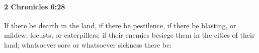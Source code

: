 
		\paragraph{2 Chronicles 6:28} %
			\label{2CHRONICLES-6-28}

			If there be dearth in the land, if there be pestilence, if there be blasting, or mildew, locusts, or caterpillers; if their enemies besiege them in the cities of their land; whatsoever sore or whatsoever sickness there be:


